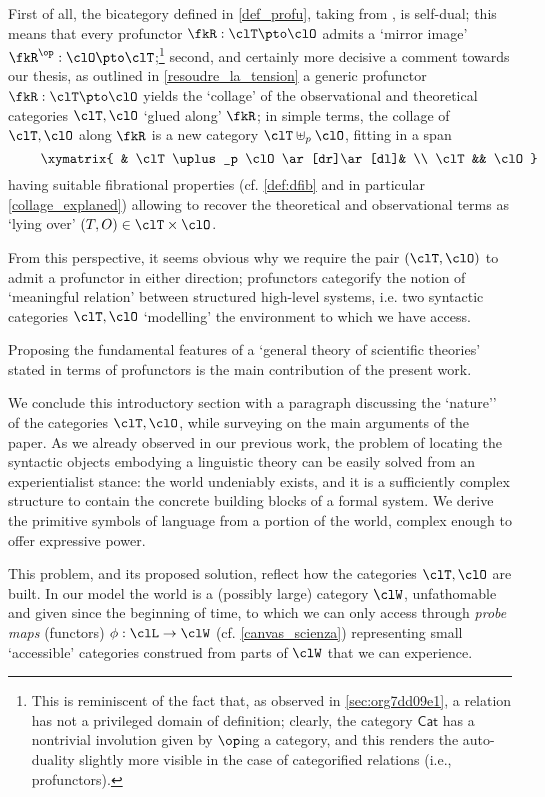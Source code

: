 First of all, the bicategory defined in \autoref{def_profu}, taking from \cite{benabou2000distributors}, is self-dual; this means that every profunctor $\fkR : \clT \pto \clO$ admits a `mirror image' $\fkR^\op : \clO \pto \clT$;\footnote{This is reminiscent of the fact that, as observed in \autoref{sec:org7dd09e1}, a relation has not a privileged domain of definition; clearly, the category $\mathsf{Cat}$ has a nontrivial involution given by $\op$ing a category, and this renders the auto-duality slightly more visible in the case of categorified relations (i.e., profunctors).} second, and certainly more decisive a comment towards our thesis, as outlined in \autoref{resoudre_la_tension} a generic profunctor $\fkR : \clT \pto\clO$ yields the `collage' of the observational and theoretical categories $\clT,\clO$ `glued along' $\fkR$; in simple terms, the collage of $\clT,\clO$ along $\fkR$ is a new category $\clT\uplus_p\clO$, fitting in a span
\[ \vcenter{\xymatrix{
      & \clT\uplus_p \clO \ar[dr]\ar[dl]& \\
      \clT  && \clO
    }} \] having suitable fibrational properties (cf. \autoref{def:dfib} and in particular \autoref{collage_explaned}) allowing to recover the theoretical and observational terms as `lying over' $(T,O)\in\clT\times\clO$.

From this perspective, it seems obvious why we require the pair $(\clT,\clO)$ to admit a profunctor in either direction; profunctors categorify the notion of `meaningful relation' between structured high-level systems, i.e. two syntactic categories $\clT,\clO$ `modelling' the environment to which we have access.

Proposing the fundamental features of a `general theory of scientific theories' stated in terms of profunctors is the main contribution of the present work.

\medskip
We conclude this introductory section with a paragraph discussing the `nature'' of the categories $\clT,\clO$, while surveying on the main arguments of the paper.
As we already observed in our previous work, the problem of locating the syntactic objects embodying a linguistic theory can be easily solved from an experientialist stance: the world undeniably exists, and it is a sufficiently complex structure to contain the concrete building blocks of a formal system. We derive the primitive symbols of language from a portion of the world, complex enough to offer expressive power.

This problem, and its proposed solution, reflect how the categories $\clT,\clO$ are built. In our model the world is a (possibly large) category $\clW$, unfathomable and given since the beginning of time, to which we can only access through \emph{probe maps} (functors) $\phi : \clL \to \clW$ (cf. \autoref{canvas_scienza}) representing small `accessible' categories construed from parts of $\clW$ that we can experience.


